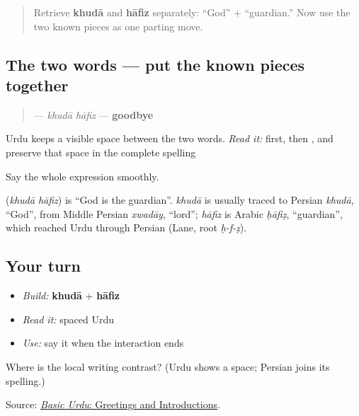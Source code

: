 \label{lesson:UR-C05-khuda-hafiz}



\begin{quote}
Retrieve \textbf{khudā} and \textbf{hāfiz} separately: “God” + “guardian.” Now use the two known pieces as one parting move.
\end{quote}

\subsection*{The two words — put the known pieces together}
\begin{quote}
\textbf{ } — \emph{khudā hāfiz} — \textbf{goodbye}
\end{quote}

Urdu keeps a visible space between the two words. \emph{Read it:} \textbf{} first, then \textbf{}, and preserve that space in the complete spelling \textbf{ }

Say the whole expression smoothly.

\begin{cousinweb}
\textbf{ } (\emph{khudā hāfiz}) is \textquotedblleft{}God is the guardian\textquotedblright{}. \emph{khudā} is usually traced to Persian \emph{khudā}, \textquotedblleft{}God\textquotedblright{}, from Middle Persian \emph{xwadāy}, \textquotedblleft{}lord\textquotedblright{}; \emph{hāfiz} is Arabic \emph{ḥāfiẓ}, \textquotedblleft{}guardian\textquotedblright{}, which reached Urdu through Persian (Lane, root \emph{ḥ-f-ẓ}).
\end{cousinweb}

\subsection*{Your turn}
\begin{itemize}
\raggedright
  \item \emph{Build:} \textbf{khudā} + \textbf{hāfiz}
  \item \emph{Read it:} spaced Urdu \textbf{ }
  \item \emph{Use:} say it when the interaction ends
\end{itemize}

\begin{tcolorbox}[breakable,colback=teal!4,colframe=teal!35!black,title={Before you move on}]
Where is the local writing contrast? (Urdu shows a space; Persian joins its spelling.)

Source: \href{https://openbooks.lib.msu.edu/urdu/chapter/2-2/}{\emph{Basic Urdu}: Greetings and Introductions}.
\end{tcolorbox}
